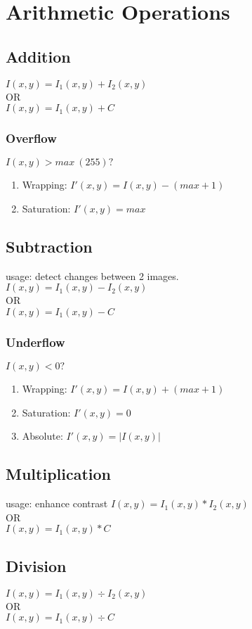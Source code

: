 \section{Arithmetic Operations}
\subsection{Addition}
$I(x,y) = I_1(x,y) + I_2(x,y)$\\
OR\\
$I(x,y) = I_1(x,y) + C$\\
\subsubsection{Overflow}
$I(x,y) > max\ (255)?$
\begin{enumerate}
  \item Wrapping: $I'(x,y) = I(x,y) - (max+1)$
  \item Saturation: $ I'(x,y) = max$
\end{enumerate}

\subsection{Subtraction}
usage: detect changes between 2 images.\\
$I(x,y) = I_1(x,y) - I_2(x,y)$\\
OR\\
$I(x,y) = I_1(x,y) - C$\\
\subsubsection{Underflow}
$I(x,y) < 0?$
\begin{enumerate}
  \item Wrapping: $I'(x,y) = I(x,y) + (max+1)$
  \item Saturation: $ I'(x,y) = 0$
  \item Absolute: $ I'(x,y) = |I(x,y)|$
\end{enumerate}
\subsection{Multiplication}
usage: enhance contrast
$I(x,y) = I_1(x,y) * I_2(x,y)$\\
OR\\
$I(x,y) = I_1(x,y) * C$\\
\subsection{Division}
$I(x,y) = I_1(x,y) \div I_2(x,y)$\\
OR\\
$I(x,y) = I_1(x,y) \div C$\\
